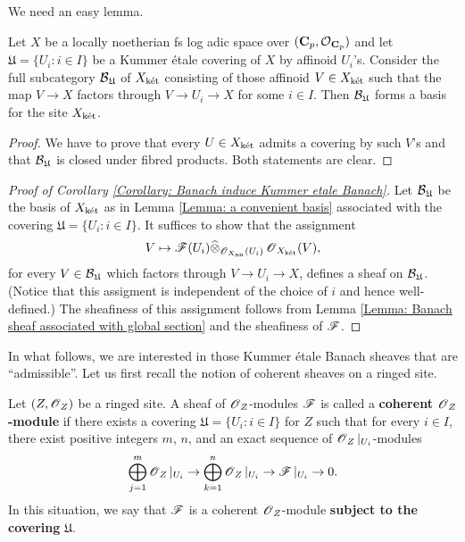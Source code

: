 We need an easy lemma.

\begin{Lemma}\label{Lemma: a convenient basis}
Let $X$ be a locally noetherian fs log adic space over $(\operatorname{\mathbf{C}}_p, \operatorname{\mathcal{O}}_{\operatorname{\mathbf{C}}_p})$ and let $\mathfrak{U}=\{U_i:i\in I\}$ be a Kummer \'etale covering of $X$ by affinoid $U_i$'s. Consider the full subcategory $\operatorname{\mathcal{B}}_{\mathfrak{U}}$ of $X_{\operatorname{\textrm{k\'{e}t}}}$ consisting of those affinoid $V\in X_{\operatorname{\textrm{k\'{e}t}}}$ such that the map $V\rightarrow X$ factors through $V\rightarrow U_i \rightarrow X$ for some $i\in I$. Then $\operatorname{\mathcal{B}}_{\mathfrak{U}}$ forms a basis for the site $X_{\operatorname{\textrm{k\'{e}t}}}$.
\end{Lemma}

\begin{proof}
We have to prove that every $U\in X_{\operatorname{\textrm{k\'{e}t}}}$ admits a covering by such $V$'s and that $\operatorname{\mathcal{B}}_{\mathfrak{U}}$ is closed under fibred products. Both statements are clear.
\end{proof}

\begin{proof}[Proof of Corollary \ref{Corollary: Banach induce Kummer etale Banach}]
Let $\operatorname{\mathcal{B}}_{\mathfrak{U}}$ be the basis of $X_{\operatorname{\textrm{k\'{e}t}}}$ as in Lemma \ref{Lemma: a convenient basis} associated with the covering $\mathfrak{U}=\{U_i: i\in I\}$. It suffices to show that the assignment $$V\mapsto \operatorname{\mathscr{F}}(U_i)\widehat{\otimes}_{\operatorname{\mathscr{O}}_{X_{\operatorname{an}}}(U_i)}\operatorname{\mathscr{O}}_{X_{\operatorname{\textrm{k\'{e}t}}}}(V),$$
for every $V\in \operatorname{\mathcal{B}}_{\mathfrak{U}}$ which factors through $V\rightarrow U_i\rightarrow X$, defines a sheaf on $\operatorname{\mathcal{B}}_{\mathfrak{U}}$. (Notice that this assigment is independent of the choice of $i$ and hence well-defined.) The sheafiness of this assignment follows from Lemma \ref{Lemma: Banach sheaf associated with global section} and the sheafiness of $\operatorname{\mathscr{F}}$.
\end{proof}

In what follows, we are interested in those Kummer \'etale Banach sheaves that are ``admissible''. Let us first recall the notion of coherent sheaves on a ringed site.

\begin{Definition}\label{Definition: coherent sheaf on ringed space}
Let $(Z, \operatorname{\mathscr{O}}_Z)$ be a ringed site. A sheaf of $\operatorname{\mathscr{O}}_Z$-modules $\operatorname{\mathscr{F}}$ is called a \textbf{coherent $\operatorname{\mathscr{O}}_Z$-module} if there exists a covering $\mathfrak{U}=\{U_i: i\in I\}$ for $Z$ such that for every $i\in I$, there exist positive integers $m$, $n$, and an exact sequence of $\operatorname{\mathscr{O}}_Z|_{U_i}$-modules
\[\bigoplus_{j=1}^m\operatorname{\mathscr{O}}_Z|_{U_i}\rightarrow \bigoplus_{k=1}^n \operatorname{\mathscr{O}}_Z|_{U_i}\rightarrow \operatorname{\mathscr{F}}|_{U_i}\rightarrow 0.\]
In this situation, we say that $\operatorname{\mathscr{F}}$ is a coherent $\operatorname{\mathscr{O}}_Z$-module \textbf{subject to the covering} $\mathfrak{U}$.
\end{Definition}

